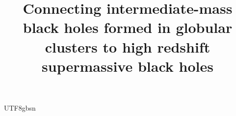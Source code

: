 \documentclass[trackchanges, twocolappendix, twocolumn]{aastex701}
\begin{document}
\begin{CJK*}{UTF8}{gbsn}

\title{Connecting intermediate-mass black holes formed in globular clusters to high redshift supermassive black holes}



\end{CJK*}
\end{document}

